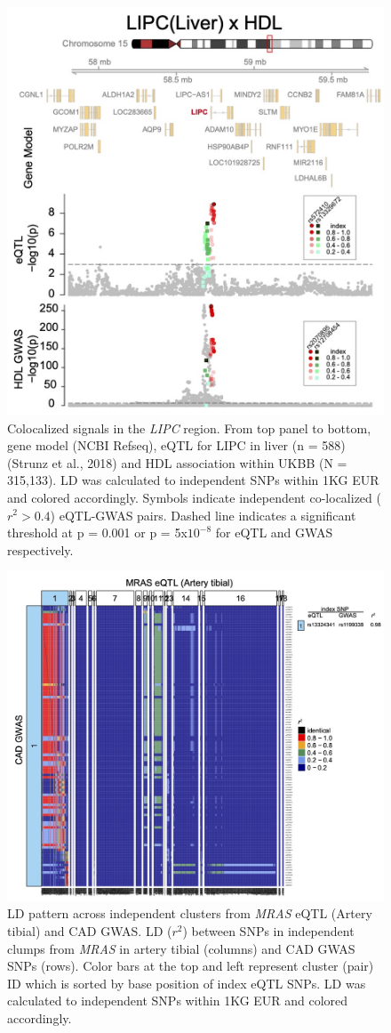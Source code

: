 \documentclass[11pt]{article}
\begin{document}
\begin{figure}[!ht]
  \centering
  \includegraphics[width=.7\textwidth]{figs/region_lipc.jpg}
  \caption{Colocalized signals in the \emph{LIPC} region. From top
    panel to bottom, gene model (NCBI Refseq), eQTL for LIPC in liver
    (n = 588) (Strunz et al., 2018) and HDL association within UKBB (N
    = 315,133). LD was calculated to independent SNPs within 1KG EUR
    and colored accordingly. Symbols indicate independent co-localized
    ($r^2> 0.4$) eQTL-GWAS pairs. Dashed line indicates a significant
    threshold at p = 0.001 or p = 5x$10^{-8}$ for eQTL and GWAS
    respectively.} 
\end{figure}

\begin{figure}[!ht]
  \centering
  \includegraphics[width=.7\textwidth]{figs/heatmap_mras.jpg}
  \caption{LD pattern across independent clusters from \emph{MRAS}
    eQTL (Artery tibial) and CAD GWAS. LD ($r^2$) between SNPs in
    independent clumps from \emph{MRAS} in artery tibial (columns) and
    CAD GWAS SNPs (rows). Color bars at the top and left represent
    cluster (pair) ID which is sorted by base position of index eQTL
    SNPs. LD was calculated to independent SNPs within 1KG EUR and
    colored accordingly.}
  \label{fig:ld1}
\end{figure}
\end{document}
